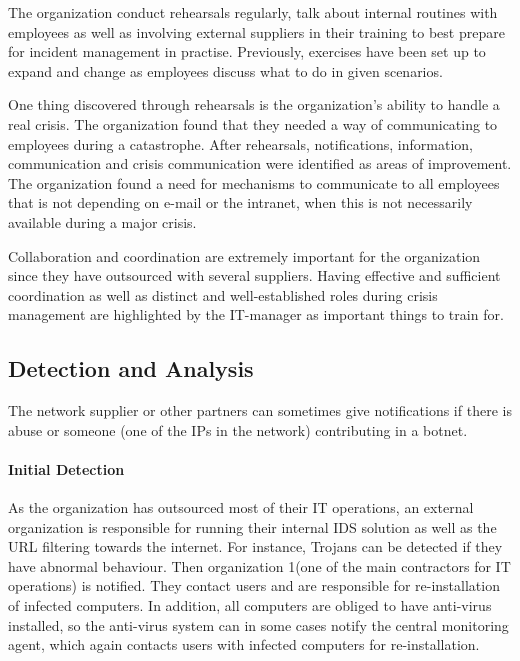 The organization conduct rehearsals regularly, talk about internal routines with employees as well as involving external suppliers in their training to best prepare for incident management in practise. Previously, exercises have been set up to expand and change as employees discuss what to do in given scenarios.

One thing discovered through rehearsals is the organization's ability to handle a real crisis. The organization found that they needed a way of communicating to employees during a catastrophe. After rehearsals, notifications, information, communication and crisis communication were identified as areas of improvement. The organization found a need for mechanisms to communicate to all employees that is not depending on e-mail or the intranet, when this is not necessarily available during a major crisis.

Collaboration and coordination are extremely important for the organization since they have outsourced with several suppliers. Having effective and sufficient coordination as well as distinct and well-established roles during crisis management are highlighted by the IT-manager as important things to train for.

\subsection{Detection and Analysis}

The network supplier or other partners can sometimes give notifications if there is abuse or someone (one of the IPs in the network) contributing in a botnet.


\paragraph{Initial Detection}

As the organization has outsourced most of their IT operations, an external organization is responsible for running their internal IDS solution as well as the URL filtering towards the internet. For instance, Trojans can be detected if they have abnormal behaviour. Then organization 1(one of the main contractors for IT operations) is notified. They contact users and are responsible for re-installation of infected computers. In addition, all computers are obliged to have anti-virus installed, so the anti-virus system can in some cases notify the central monitoring agent, which again contacts users with infected computers for re-installation. 

